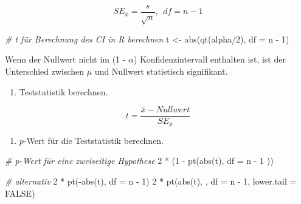 \documentclass[
]{book}
\newenvironment{Shaded}{\begin{snugshade}}{\end{snugshade}}
\newcommand{\AttributeTok}[1]{\textcolor[rgb]{0.77,0.63,0.00}{#1}}
\newcommand{\CommentTok}[1]{\textcolor[rgb]{0.56,0.35,0.01}{\textit{#1}}}
\newcommand{\ConstantTok}[1]{\textcolor[rgb]{0.00,0.00,0.00}{#1}}
\newcommand{\DecValTok}[1]{\textcolor[rgb]{0.00,0.00,0.81}{#1}}
\newcommand{\FunctionTok}[1]{\textcolor[rgb]{0.00,0.00,0.00}{#1}}
\newcommand{\NormalTok}[1]{#1}
\newcommand{\OtherTok}[1]{\textcolor[rgb]{0.56,0.35,0.01}{#1}}
\newcommand{\SpecialCharTok}[1]{\textcolor[rgb]{0.00,0.00,0.00}{#1}}
\providecommand{\tightlist}{%
  \setlength{\itemsep}{0pt}\setlength{\parskip}{0pt}}
\begin{document}
\begin{equation}
  SE_{\bar{x}} = \frac{s}{\sqrt{n}}, ~~ df = n-1
  \label{eq:se-ttest}
\end{equation}

\begin{Shaded}
\begin{Highlighting}[]
\CommentTok{\# t für Berechnung des CI in R berechnen}
\NormalTok{t }\OtherTok{\textless{}{-}} \FunctionTok{abs}\NormalTok{(}\FunctionTok{qt}\NormalTok{(alpha}\SpecialCharTok{/}\DecValTok{2}\NormalTok{), }\AttributeTok{df =}\NormalTok{ n }\SpecialCharTok{{-}} \DecValTok{1}\NormalTok{)}
\end{Highlighting}
\end{Shaded}

Wenn der Nullwert nicht im (1 - \(\alpha\)) Konfidenzintervall enthalten ist, ist der
Unterschied zwischen \(\mu\) und Nullwert statistisch signifikant.

\begin{enumerate}
\def\labelenumi{\arabic{enumi}.}
\setcounter{enumi}{4}
\tightlist
\item
  Teststatistik berechnen.
\end{enumerate}

\begin{equation}
  t = \frac{\bar{x} - Nullwert}{SE_{\bar{x}}}
  \label{eq:t-ztest}
\end{equation}

\begin{enumerate}
\def\labelenumi{\arabic{enumi}.}
\setcounter{enumi}{5}
\tightlist
\item
  \(p\)-Wert für die Teststatistik berechnen.
\end{enumerate}

\begin{Shaded}
\begin{Highlighting}[]
\CommentTok{\# p{-}Wert für eine zweiseitige Hypothese}
\DecValTok{2} \SpecialCharTok{*}\NormalTok{ (}\DecValTok{1} \SpecialCharTok{{-}} \FunctionTok{pt}\NormalTok{(}\FunctionTok{abs}\NormalTok{(t), }\AttributeTok{df =}\NormalTok{ n }\SpecialCharTok{{-}} \DecValTok{1}\NormalTok{ ))}

\CommentTok{\# alternativ}
\DecValTok{2} \SpecialCharTok{*} \FunctionTok{pt}\NormalTok{(}\SpecialCharTok{{-}}\FunctionTok{abs}\NormalTok{(t), }\AttributeTok{df =}\NormalTok{ n }\SpecialCharTok{{-}} \DecValTok{1}\NormalTok{)}
\DecValTok{2} \SpecialCharTok{*} \FunctionTok{pt}\NormalTok{(}\FunctionTok{abs}\NormalTok{(t), , }\AttributeTok{df =}\NormalTok{ n }\SpecialCharTok{{-}} \DecValTok{1}\NormalTok{, }\AttributeTok{lower.tail =} \ConstantTok{FALSE}\NormalTok{)}
\end{Highlighting}
\end{Shaded}
\end{document}
